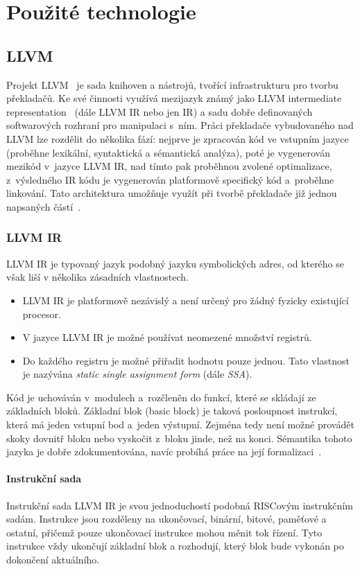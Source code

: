 \documentclass[12pt]{fithesis2}
\begin{document}
\chapter{Použité technologie}
\label{sec:technologies}
\section{LLVM}
Projekt LLVM~\cite{LLVM} je sada knihoven a nástrojů, tvořící infrastrukturu pro tvorbu překladačů. Ke své činnosti využívá mezijazyk známý jako LLVM intermediate representation~\cite{LLVM-langRef} (dále LLVM IR nebo jen IR) a sadu dobře definovaných softwarových rozhraní pro manipulaci s~ním. Práci překladače vybudovaného nad LLVM lze rozdělit do několika fází: nejprve je zpracován kód ve vstupním jazyce (proběhne lexikální, syntaktická a sémantická analýza), poté je vygenerován mezikód v~jazyce LLVM IR, nad tímto pak proběhnou zvolené optimalizace, z~výsledného IR kódu je vygenerován platformově specifický kód a~proběhne linkování. Tato architektura umožňuje využít při tvorbě překladače již jednou napsaných částí~\cite{AOSABOOK-LLVM}.

\subsection{LLVM IR}
LLVM IR je typovaný jazyk podobný jazyku symbolických adres, od kterého se však liší v několika zásadních vlastnostech.
\begin{itemize}
\item LLVM IR je platformově nezávislý a není určený pro žádný fyzicky existující procesor.
\item V jazyce LLVM IR je možné používat neomezené množství registrů.
\item Do každého registru je možné přiřadit hodnotu pouze jednou. Tato vlastnost je nazývána \textit{static single assignment form} (dále \textit{SSA}).
\end{itemize}
Kód je uchováván v~modulech a~rozčleněn do funkcí, které se skládají ze základních bloků. Základní blok (basic block) je taková posloupnost instrukcí, která má jeden vstupní bod a~jeden výstupní. Zejména tedy není možné provádět skoky dovnitř bloku nebo vyskočit z~bloku jinde, než na konci. Sémantika tohoto jazyka je dobře zdokumentována, navíc probíhá práce na její formalizaci~\cite{LLVMForm}.

\subsubsection{Instrukční sada}
Instrukční sada LLVM IR je svou jednoduchostí podobná RISCovým instrukčním sadám. Instrukce jsou rozděleny na ukončovací, binární, bitové, paměťové a ostatní, přičemž pouze ukončovací instrukce mohou měnit tok řízení. Tyto instrukce vždy ukončují základní blok a rozhodují, který blok bude vykonán po dokončení aktuálního.
\end{document}
